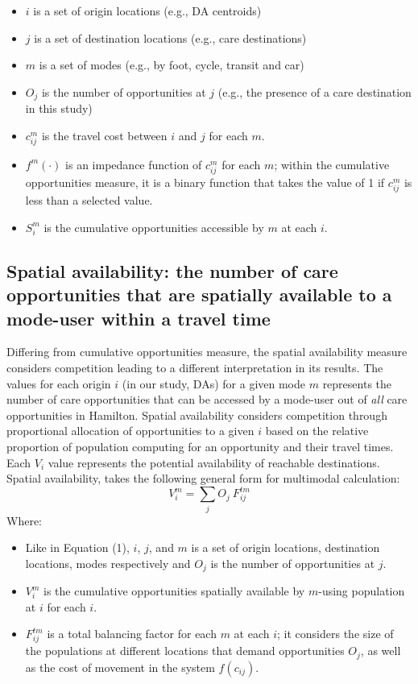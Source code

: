 \documentclass[
  authoryear,
  preprint,
  3p]{elsarticle}
\providecommand{\tightlist}{%
  \setlength{\itemsep}{0pt}\setlength{\parskip}{0pt}}\usepackage{longtable,booktabs,array}
\def\tightlist{}
\begin{document}
\begin{itemize}
\tightlist
\item
  \(i\) is a set of origin locations (e.g., DA centroids)
\item
  \(j\) is a set of destination locations (e.g., care destinations)
\item
  \(m\) is a set of modes (e.g., by foot, cycle, transit and car)
\item
  \(O_j\) is the number of opportunities at \(j\) (e.g., the presence of
  a care destination in this study)
\item
  \(c_{ij}^m\) is the travel cost between \(i\) and \(j\) for each
  \(m\).
\item
  \(f^m(\cdot)\) is an impedance function of \(c^m_{ij}\) for each
  \(m\); within the cumulative opportunities measure, it is a binary
  function that takes the value of 1 if \(c^m_{ij}\) is less than a
  selected value.
\item
  \(S^m_{i}\) is the cumulative opportunities accessible by \(m\) at
  each \(i\).
\end{itemize}

\subsection{Spatial availability: the number of care opportunities that
are spatially available to a mode-user within a travel
time}\label{spatial-availability-the-number-of-care-opportunities-that-are-spatially-available-to-a-mode-user-within-a-travel-time}

Differing from cumulative opportunities measure, the spatial
availability measure considers competition leading to a different
interpretation in its results. The values for each origin \(i\) (in our
study, DAs) for a given mode \(m\) represents the number of care
opportunities that can be accessed by a mode-user out of \emph{all} care
opportunities in Hamilton. Spatial availability considers competition
through proportional allocation of opportunities to a given \(i\) based
on the relative proportion of population computing for an opportunity
and their travel times. Each \(V_i\) value represents the potential
availability of reachable destinations. Spatial availability, takes the
following general form for multimodal calculation: \[
V^m_{i} = \sum_{j} O_j\ F^{tm}_{ij}
\] \noindent Where:

\begin{itemize}
\tightlist
\item
  Like in Equation (1), \(i\), \(j\), and \(m\) is a set of origin
  locations, destination locations, modes respectively and \(O_j\) is
  the number of opportunities at \(j\).
\item
  \(V^m_{i}\) is the cumulative opportunities spatially available by
  \(m\)-using population at \(i\) for each \(i\).
\item
  \(F^{tm}_{ij}\) is a total balancing factor for each \(m\) at each
  \(i\); it considers the size of the populations at different locations
  that demand opportunities \(O_j\), as well as the cost of movement in
  the system \(f(c_{ij})\).
\end{itemize}
\end{document}
